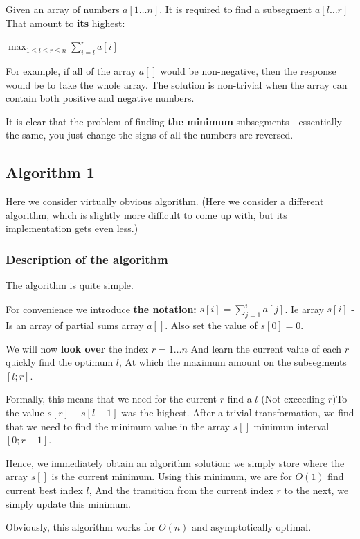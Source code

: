 Given an array of numbers $a [1 \ldots n]$. It is required to find a subsegment $a [l \ldots r]$ That amount to \textbf{its} highest:

$\max_{1\le l\leq r\leq n}\sum_{i=l}^{r}a[i]$

For example, if all of the array $a []$ would be non-negative, then the response would be to take the whole array. The solution is non-trivial when the array can contain both positive and negative numbers.

It is clear that the problem of finding \textbf{the minimum} subsegments - essentially the same, you just change the signs of all the numbers are reversed.

\subsection{ Algorithm 1 }

Here we consider virtually obvious algorithm. (Here we consider a different algorithm, which is slightly more difficult to come up with, but its implementation gets even less.)

\subsubsection{ Description of the algorithm }

The algorithm is quite simple.

For convenience we introduce \textbf{the notation:} $s [i] = \sum_ {j = 1} ^ {i} a [j]$. Ie array $s [i]$ - Is an array of partial sums array $a []$. Also set the value of $s [0] = 0$.

We will now \textbf{look over} the index $r = 1 \ldots n$ And learn the current value of each $r$ quickly find the optimum $l$, At which the maximum amount on the subsegments $[l; r]$.

Formally, this means that we need for the current $r$ find a $l$ (Not exceeding $r$)To the value $s [r] - s [l-1]$ was the highest. After a trivial transformation, we find that we need to find the minimum value in the array $s []$ minimum interval $[0; r-1]$.

Hence, we immediately obtain an algorithm solution: we simply store where the array $s []$ is the current minimum. Using this minimum, we are for $O (1)$ find current best index $l$, And the transition from the current index $r$ to the next, we simply update this minimum.

Obviously, this algorithm works for $O (n)$ and asymptotically optimal.

